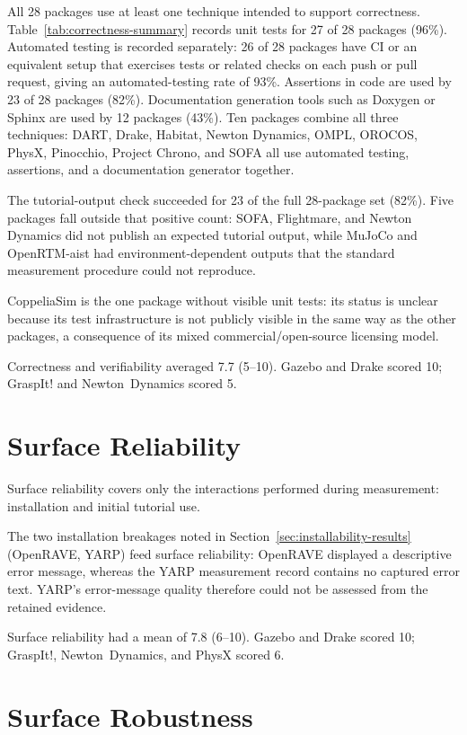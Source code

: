 All 28 packages use at least one technique intended to support correctness. Table~\ref{tab:correctness-summary} records unit tests for 27 of 28 packages (96\%). Automated testing is recorded separately: 26 of 28 packages have CI or an equivalent setup that exercises tests or related checks on each push or pull request, giving an automated-testing rate of 93\%. Assertions in code are used by 23 of 28 packages (82\%). Documentation generation tools such as Doxygen or Sphinx are used by 12 packages (43\%). Ten packages combine all three techniques: DART, Drake, Habitat, Newton Dynamics, OMPL, OROCOS, PhysX, Pinocchio, Project Chrono, and SOFA all use automated testing, assertions, and a documentation generator together.

The tutorial-output check succeeded for 23 of the full 28-package set (82\%). Five packages fall outside that positive count: SOFA, Flightmare, and Newton Dynamics did not publish an expected tutorial output, while MuJoCo and OpenRTM-aist had environment-dependent outputs that the standard measurement procedure could not reproduce.

CoppeliaSim is the one package without visible unit tests: its status is unclear because its test infrastructure is not publicly visible in the same way as the other packages, a consequence of its mixed commercial/open-source licensing model.

Correctness and verifiability averaged 7.7 (5--10). Gazebo and Drake scored 10; GraspIt! and Newton~Dynamics scored 5.

\section{Surface Reliability}
\label{sec:surface-reliability-results}

Surface reliability covers only the interactions performed during measurement: installation and initial tutorial use.

The two installation breakages noted in Section~\ref{sec:installability-results} (OpenRAVE, YARP) feed surface reliability: OpenRAVE displayed a descriptive error message, whereas the YARP measurement record contains no captured error text. YARP's error-message quality therefore could not be assessed from the retained evidence.

Surface reliability had a mean of 7.8 (6--10). Gazebo and Drake scored 10; GraspIt!, Newton~Dynamics, and PhysX scored 6.

\section{Surface Robustness}
\label{sec:surface-robustness-results}

